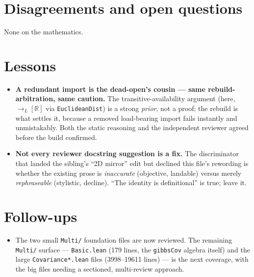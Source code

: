 \documentclass[11pt]{article}
\begin{document}
\section{Disagreements and open questions}
None on the mathematics.

\section{Lessons}
\begin{itemize}[noitemsep]
  \item \textbf{A redundant import is the dead-open's cousin --- same rebuild-arbitration, same caution.} The
    transitive-availability argument (here, $\to_L[\mathbb R]$ via \texttt{EuclideanDist}) is a strong
    \emph{prior}, not a proof; the rebuild is what settles it, because a removed load-bearing import fails
    instantly and unmistakably. Both the static reasoning and the independent reviewer agreed before the build
    confirmed.
  \item \textbf{Not every reviewer docstring suggestion is a fix.} The discriminator that landed the
    sibling's ``2D mirror'' edit but declined this file's rewording is whether the existing prose is
    \emph{inaccurate} (objective, landable) versus merely \emph{rephraseable} (stylistic, decline). ``The
    identity is definitional'' is true; leave it.
\end{itemize}

\section{Follow-ups}
\begin{itemize}[noitemsep]
  \item The two small \texttt{Multi/} foundation files are now reviewed. The remaining \texttt{Multi/}
    surface --- \texttt{Basic.lean} (179 lines, the \texttt{gibbsCov} algebra itself) and the large
    \texttt{Covariance*.lean} files (3998--19611 lines) --- is the next coverage, with the big files needing
    a sectioned, multi-review approach.
\end{itemize}
\end{document}

